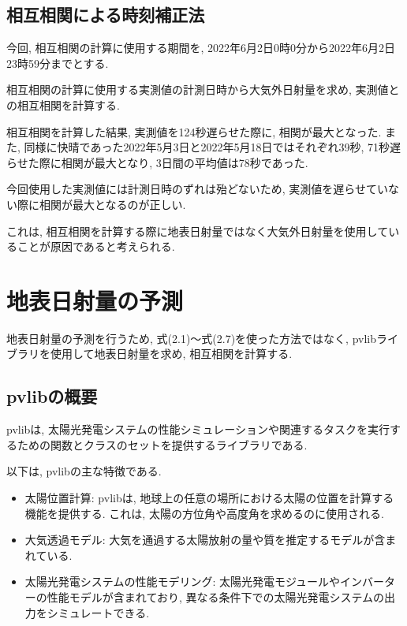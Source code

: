 
\subsection{相互相関による時刻補正法}
今回, 相互相関の計算に使用する期間を, 2022年6月2日0時0分から2022年6月2日23時59分までとする.


相互相関の計算に使用する実測値の計測日時から大気外日射量を求め, 実測値との相互相関を計算する.

相互相関を計算した結果, 実測値を124秒遅らせた際に, 相関が最大となった. また, 同様に快晴であった2022年5月3日と2022年5月18日ではそれぞれ39秒, 71秒遅らせた際に相関が最大となり, 3日間の平均値は78秒であった.

今回使用した実測値には計測日時のずれは殆どないため, 実測値を遅らせていない際に相関が最大となるのが正しい.

これは, 相互相関を計算する際に地表日射量ではなく大気外日射量を使用していることが原因であると考えられる.

\section{地表日射量の予測}

地表日射量の予測を行うため, 式(2.1)～式(2.7)を使った方法ではなく, pvlibライブラリを使用して地表日射量を求め, 相互相関を計算する.

\subsection{pvlibの概要}
pvlibは, 太陽光発電システムの性能シミュレーションや関連するタスクを実行するための関数とクラスのセットを提供するライブラリである. 

以下は, pvlibの主な特徴である.

\begin{itemize}
  \item 太陽位置計算: pvlibは, 地球上の任意の場所における太陽の位置を計算する機能を提供する. これは, 太陽の方位角や高度角を求めるのに使用される.
  \item 大気透過モデル: 大気を通過する太陽放射の量や質を推定するモデルが含まれている.
  \item 太陽光発電システムの性能モデリング: 太陽光発電モジュールやインバーターの性能モデルが含まれており, 異なる条件下での太陽光発電システムの出力をシミュレートできる.
\end{itemize}

